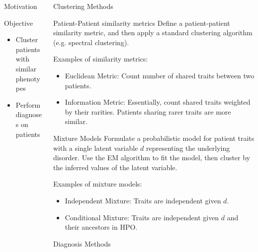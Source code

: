 \documentclass[final]{beamer} %
\begin{document}
\begin{frame}{}
\begin{columns}[T]
\begin{column}{0.3\linewidth}
\begin{block}{\Huge Motivation}
   \end{block}

    \begin{block}{\Huge Objective}
     \begin{itemize}
    \Large
     \item
     Cluster patients with similar phenotypes
    \item
    Perform diagnoses on patients
     \end{itemize}
      \end{block}
    \end{column}

    \begin{column}{0.3\linewidth}
     \begin{block}{\Huge Clustering Methods}
     \Large
		\begin{block}{\Large Patient-Patient similarity metrics}
			Define a patient-patient similarity metric, and then apply a standard clustering algorithm (e.g. spectral clustering).

			Examples of similarity metrics:
			\begin{itemize}
				\item Euclidean Metric: Count number of shared traits between two patients.
				\item Information Metric: Essentially, count shared traits weighted by their rarities. Patients sharing rarer traits are more similar.
			\end{itemize}
		\end{block}
		\begin{block}{\Large Mixture Models}
			Formulate a probabilistic model for patient traits with a single latent variable $d$ representing the underlying disorder. Use the EM algorithm to fit the model, then cluster by the inferred values of the latent variable.

			Examples of mixture models:
			\begin{itemize}
				\item Independent Mixture: Traits are independent given $d$.
				\item Conditional Mixture: Traits are independent given $d$ and their ancestors in HPO.
			\end{itemize}
		\end{block}
     \end{block}
     \vspace{3cm}

     \begin{block}{\Huge Diagnosis Methods}
   

\end{block}
\end{column}
\end{columns}
\end{frame}
\end{document}
